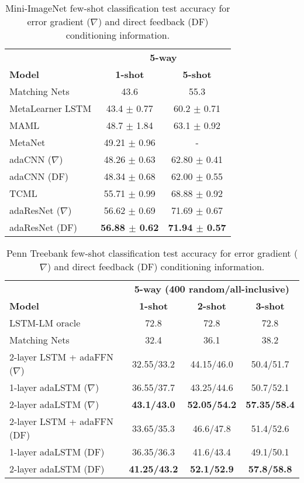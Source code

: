 \documentclass{article}
\begin{document}
\begin{table*}[t] \caption{Mini-ImageNet few-shot classification test accuracy for error gradient ($\nabla$) and direct feedback (DF) conditioning information.}
  \label{tab:mini}
  \small
  \centering
  \begin{tabular}{lcc}
    \toprule
    {} & \multicolumn{2}{c}{\bf 5-way} \\
    \cmidrule(l{3pt}r{3pt}){2-3} 
    \bf Model & \bf 1-shot & \bf 5-shot \\
    \midrule
    Matching Nets \cite{vinyals2016matching} & 43.6 & 55.3 \\
    MetaLearner LSTM \cite{Sachin2017} & 43.4 $\pm$ 0.77 & 60.2 $\pm$ 0.71 \\
    MAML \cite{finn2017model} & 48.7 $\pm$ 1.84 & 63.1 $\pm$ 0.92 \\
    MetaNet \cite{pmlr-v70-munkhdalai17a} &  49.21 $\pm$ 0.96 & - \\
    \midrule
    adaCNN ($\nabla$) & 48.26 $\pm$ 0.63 & 62.80 $\pm$ 0.41 \\
    adaCNN (DF) & 48.34 $\pm$ 0.68 & 62.00 $\pm$ 0.55 \\
    \midrule \midrule
    TCML \cite{mishra2017meta} & 55.71 $\pm$ 0.99 & 68.88 $\pm$ 0.92 \\
    \midrule
adaResNet ($\nabla$) & 56.62 $\pm$ 0.69 & 71.69 $\pm$ 0.67 \\
    adaResNet (DF) & \bf 56.88 $\pm$ 0.62 & \bf 71.94 $\pm$ 0.57 \\
    \bottomrule
  \end{tabular}
\end{table*}
\begin{table*}[t] \caption{Penn Treebank few-shot classification test accuracy for error gradient ($\nabla$) and direct feedback (DF) conditioning information.}
  \label{tab:lm}
  \small
  \centering
  \begin{tabular}{lccc}
    \toprule
    {} & \multicolumn{3}{c}{\bf 5-way (400 random/all-inclusive)} \\
    \cmidrule(l{3pt}r{3pt}){2-4} 
    \bf Model & \bf 1-shot & \bf 2-shot & \bf 3-shot \\
    \midrule
    LSTM-LM oracle \cite{vinyals2016matching} & 72.8 & 72.8 & 72.8 \\
    Matching Nets \cite{vinyals2016matching} & 32.4 & 36.1 & 38.2 \\
    \midrule
2-layer LSTM + adaFFN ($\nabla$) & 32.55/33.2 &	44.15/46.0 &	50.4/51.7 \\
     1-layer adaLSTM ($\nabla$) & 36.55/37.7 &	43.25/44.6 &	50.7/52.1 \\
     2-layer adaLSTM ($\nabla$) & \bf 43.1/43.0 & \bf	52.05/54.2 & \bf	57.35/58.4 \\
     2-layer LSTM + adaFFN (DF) & 33.65/35.3 &	46.6/47.8 &	51.4/52.6 \\
    1-layer adaLSTM (DF) & 36.35/36.3 &	41.6/43.4 &	49.1/50.1 \\
    2-layer adaLSTM (DF) & \bf 41.25/43.2 & \bf	52.1/52.9 & \bf	57.8/58.8 \\
    \bottomrule
  \end{tabular}
\end{table*}
\end{document}
